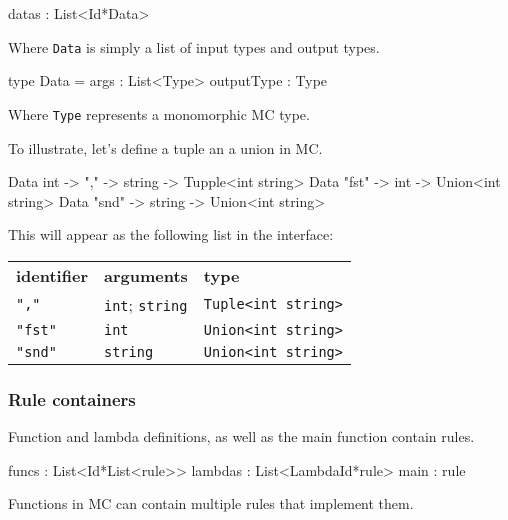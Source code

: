 \begin{FS}
datas : List<Id*Data>
\end{FS}

Where \verb|Data| is simply a list of input types and output types.

\begin{FS}
type Data = {
  args       : List<Type>
  outputType : Type
}
\end{FS}

Where \verb|Type| represents a monomorphic MC type.


To illustrate, let's define a tuple an a union in MC.

\begin{MC}
Data int -> "," -> string -> Tupple<int string>
Data "fst" -> int    -> Union<int string>
Data "snd" -> string -> Union<int string>
\end{MC}

This will appear as the following list in the interface:

{\footnotesize
\begin{tabular}{lll}
    \textbf{\normalsize identifier} & \textbf{\normalsize arguments} & \textbf{\normalsize type}\\
    \verb:",":   & \verb:int:; \verb:string: & \verb:Tuple<int string>: \\
    \verb:"fst": & \verb:int:                & \verb:Union<int string>: \\
    \verb:"snd": & \verb:string:             & \verb:Union<int string>: \\
\end{tabular}
}


\subsubsection{Rule containers}

Function and lambda definitions, as well as the main function contain rules.

\begin{FS}
  funcs   : List<Id*List<rule>>
  lambdas : List<LambdaId*rule>
  main    : rule
\end{FS}

Functions in MC can contain multiple rules that implement them.

